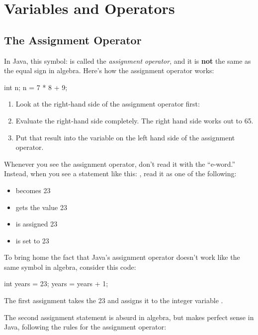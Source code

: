 \chapter{Variables and Operators}
\label{variables}
\section{The Assignment Operator}
In Java, this symbol: \java{=} is called the {\em assignment operator}, and it is {\bf not} the same as the equal sign in algebra.
Here's how the assignment operator works:

\begin{code}
int n;
n = 7 * 8 + 9;
\end{code}

\begin{enumerate}
\item Look at the right-hand side of the assignment operator first: 
\item Evaluate the right-hand side completely. The right hand side works out to 65.
\item Put that result into the variable on the left hand side of the assignment operator.
\end{enumerate}

Whenever you see the assignment operator, don't read it with the ``e-word.'' Instead, when you see a statement like this:
, read it as one of the following:

\begin{itemize}
\item {} becomes 23
\item {} gets the value 23
\item {} is assigned 23
\item {} is set to 23
\end{itemize}

To bring home the fact that Java's assignment operator \java{=} doesn't work like the same symbol in algebra, consider this code:

\begin{code}
int years = 23;
years = years + 1;
\end{code}

The first assignment takes the 23 and assigns it to the integer variable .

The second assignment statement is absurd in algebra, but makes perfect sense in Java, following the rules for the assignment operator:

